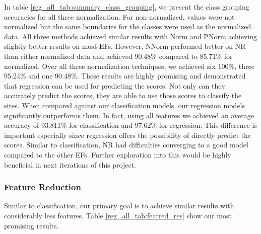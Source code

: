 \documentclass[12pt,letterpaper]{article}
\begin{document}
In table \ref{reg_all_tab:summary_class_grouping}, we present the class grouping accuracies for all three normalization.
For non-normalized, values were not normalized but the same boundaries for the classes were used as the normalized data.
All three methods achieved similar results with \ac{Norm} and \ac{PNorm} achieving slightly better results on most \ac{EF}s.
However, \ac{NNorm} performed better on \ac{NR} than either normalized data and achieved 90.48\% compared to 85.71\% for normalized.
Over all three normalization techniques, we achieved six 100\%, three 95.24\% and one 90.48\%.
These results are highly promising and demonstrated that regression can be used for predicting the scores.
Not only can they accurately predict the scores, they are able to use those scores to classify the sites.
When compared against our classification models, our regression models significantly outperforms them.
In fact, using all features we achieved an average accuracy of 93.811\% for classification and 97.62\% for regression.  
This difference is important especially since regression offers the possibility of directly predict the scores. 
Similar to classification, \ac{NR} had difficulties converging to a good model compared to the other \ac{EF}s.
Further exploration into this would be highly beneficial in next iterations of this project.

\subsubsection{Feature Reduction}
Similar to classification, our primary goal is to achieve similar results with considerably less features.
Table \ref{reg_all_tab:featred_res} show our most promising results.
\end{document}
